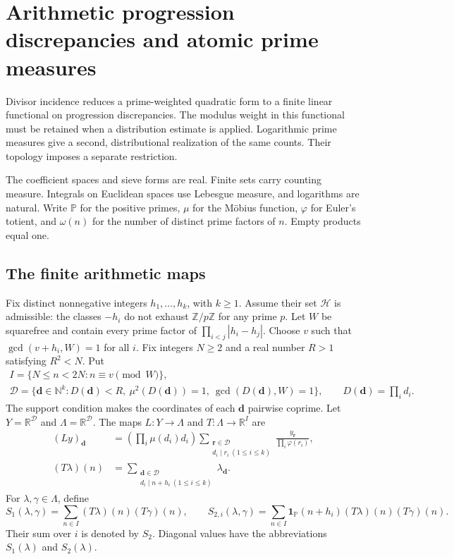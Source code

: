 \section{Arithmetic progression discrepancies and atomic prime measures}
\label{acfd:section}

Divisor incidence reduces a prime-weighted quadratic form to a finite
linear functional on progression discrepancies.  The modulus weight in this
functional must be retained when a distribution estimate is applied.
Logarithmic prime measures give a second, distributional realization of
the same counts.  Their topology imposes a separate restriction.

The coefficient spaces and sieve forms are real.  Finite sets carry counting measure.
Integrals on Euclidean spaces use Lebesgue measure, and logarithms are natural.
Write $\mathbb P$ for the positive primes, $\mu$ for the M\"obius function,
$\varphi$ for Euler's totient, and $\omega(n)$ for the number of distinct
prime factors of $n$.  Empty products equal one.

\subsection{The finite arithmetic maps}

Fix distinct nonnegative integers $h_1,\ldots,h_k$, with $k\geq1$.
Assume their set $\mathcal H$ is admissible: the classes $-h_i$ do not
exhaust $\mathbb Z/p\mathbb Z$ for any prime $p$.
Let $W$ be squarefree and contain every prime factor of
$\prod_{i<j}|h_i-h_j|$.  Choose $v$ such that
$\gcd(v+h_i,W)=1$ for all $i$.
Fix integers $N\geq2$ and a real number $R>1$ satisfying $R^2<N$.
Put
\begin{gather*}
 I=\{N\leq n<2N:n\equiv v\pmod W\},\\
 \mathcal D=\{\boldsymbol d\in\mathbb N^k:
     D(\boldsymbol d)<R,\ \mu^2(D(\boldsymbol d))=1,
     \ \gcd(D(\boldsymbol d),W)=1\},
 \qquad D(\boldsymbol d)=\prod_i d_i.
\end{gather*}
The support condition makes the coordinates of each $\boldsymbol d$
pairwise coprime.  Let $Y=\mathbb R^{\mathcal D}$ and
$\Lambda=\mathbb R^{\mathcal D}$.  The maps
$L:Y\to\Lambda$ and $T:\Lambda\to\mathbb R^I$ are
\begin{align}
 (Ly)_{\boldsymbol d}
 &=\left(\prod_i\mu(d_i)d_i\right)
   \sum_{\substack{\boldsymbol r\in\mathcal D\\d_i\mid r_i\ (1\leq i\leq k)}}
       \frac{y_{\boldsymbol r}}{\prod_i\varphi(r_i)},
       \label{acfd:mobius}\\
 (T\lambda)(n)
 &=\sum_{\substack{\boldsymbol d\in\mathcal D\\d_i\mid n+h_i\ (1\leq i\leq k)}}
       \lambda_{\boldsymbol d}.
       \label{acfd:incidence}
\end{align}
For $\lambda,\gamma\in\Lambda$, define
\[
 S_1(\lambda,\gamma)=\sum_{n\in I}(T\lambda)(n)(T\gamma)(n),\qquad
 S_{2,i}(\lambda,\gamma)=\sum_{n\in I}
     \mathbf1_{\mathbb P}(n+h_i)(T\lambda)(n)(T\gamma)(n).
\]
Their sum over $i$ is denoted by $S_2$.  Diagonal values have the
abbreviations $S_1(\lambda)$ and $S_2(\lambda)$.

